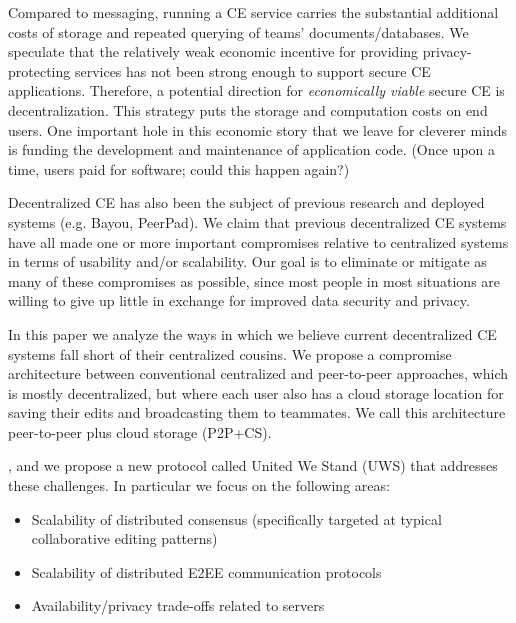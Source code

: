 \documentclass{article}
\begin{document}
Compared to messaging, running a CE service carries the substantial additional costs of storage and repeated querying of teams' documents{\slash}databases.
We speculate that the relatively weak economic incentive for providing privacy-protecting services has not been strong enough to support secure CE applications.
Therefore, a potential direction for \emph{economically viable} secure CE is decentralization.
This strategy puts the storage and computation costs on end users.
One important hole in this economic story that we leave for cleverer minds is funding the development and maintenance of application code.
(Once upon a time, users paid for software; could this happen again?)

Decentralized CE has also been the subject of previous research and deployed systems (e.g. Bayou\cite{TODO}, PeerPad\cite{TODO}).
We claim that previous decentralized CE systems have all made one or more important compromises relative to centralized systems in terms of usability and/or scalability.
Our goal is to eliminate or mitigate as many of these compromises as possible, since most people in most situations are willing to give up little in exchange for improved data security and privacy.

In this paper we analyze the ways in which we believe current decentralized CE systems fall short of their centralized cousins.
We propose a compromise architecture between conventional centralized and peer-to-peer approaches, which is mostly decentralized, but where each user also has a cloud storage location for saving their edits and broadcasting them to teammates.
We call this architecture peer-to-peer plus cloud storage (P2P+CS).

, and we propose a new protocol called United We Stand (UWS) that addresses these challenges.
In particular we focus on the following areas:
\begin{itemize}
\item Scalability of distributed consensus (specifically targeted at typical collaborative editing patterns)
\item Scalability of distributed E2EE communication protocols
\item Availability/privacy trade-offs related to servers
\end{itemize}


\end{document}

